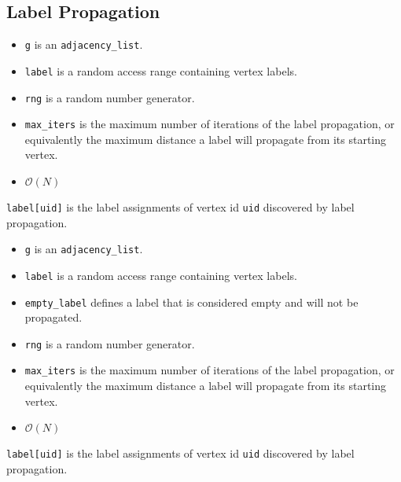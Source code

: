 \subsection{Label Propagation}
{\small
      
}
\begin{itemdescr}
      \pnum\preconditions
      \begin{itemize}
            \item
              \lstinline{g} is an \lstinline{adjacency_list}.
            \item
              \lstinline{label} is a random access range containing vertex labels.
            \item
              \lstinline{rng} is a random number generator.
            \item
              \lstinline{max_iters} is the maximum number of iterations of the label propagation, or equivalently the maximum distance a label will propagate from its starting vertex.
            \item
              \pnum\complexity $\mathcal{O}(N)$ 
      \end{itemize}
      \pnum\effects \lstinline{label[uid]} is the label assignments of vertex id \lstinline{uid} discovered by label propagation.
\end{itemdescr}

{\small
      
}
\begin{itemdescr}
      \pnum\preconditions
      \begin{itemize}
            \item
              \lstinline{g} is an \lstinline{adjacency_list}.
            \item
              \lstinline{label} is a random access range containing vertex labels.
            \item
              \lstinline{empty_label} defines a label that is considered empty and will not be propagated.
            \item
              \lstinline{rng} is a random number generator.
            \item
              \lstinline{max_iters} is the maximum number of iterations of the label propagation, or equivalently the maximum distance a label will propagate from its starting vertex.
            \item
              \pnum\complexity $\mathcal{O}(N)$
      \end{itemize}
      \pnum\effects \lstinline{label[uid]} is the label assignments of vertex id \lstinline{uid} discovered by label propagation.
\end{itemdescr}


